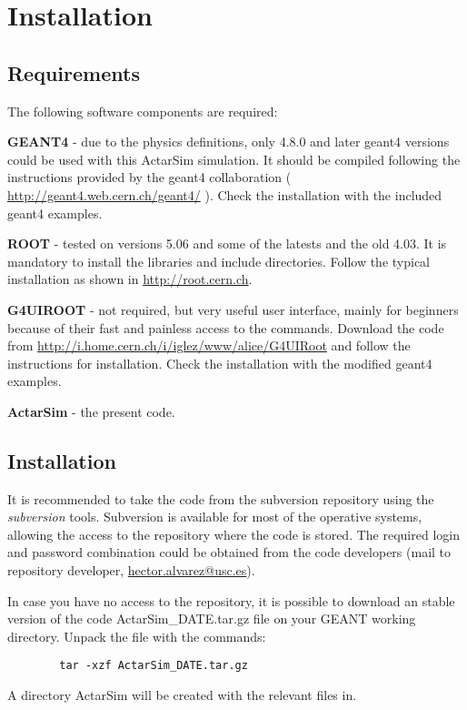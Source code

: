 \section{Installation}

\subsection{Requirements}

The following software components are required:

\textbf{GEANT4} - due to the physics definitions, only 4.8.0 and later geant4 versions could be used with this ActarSim simulation. It should be compiled following the instructions provided by the geant4 collaboration ( \url{http://geant4.web.cern.ch/geant4/} ). Check the installation with the included geant4 examples.

\textbf{ROOT} - tested on versions 5.06 and some of the latests and the old 4.03. It is mandatory to install the libraries and include directories. Follow the typical installation as shown in \url{http://root.cern.ch}.

\textbf{G4UIROOT} - not required, but very useful user interface, mainly for beginners because of their fast and painless access to the commands. Download the code from \url{http://i.home.cern.ch/i/iglez/www/alice/G4UIRoot} and follow the instructions for installation. Check the installation with the modified geant4 examples.

\textbf{ActarSim} - the present code.

\subsection{Installation}

It is recommended to take the code from the subversion repository using the \textit{subversion} tools. Subversion is available for most of the operative systems, allowing the access to the repository where the code is stored. The required login and password combination could be obtained from the code developers (mail to repository developer, \url{hector.alvarez@usc.es}).

In case you have no access to the repository, it is possible to download an stable version of the code ActarSim\_DATE.tar.gz file on your GEANT working directory. Unpack the file with the commands:
\begin{verbatim}
        tar -xzf ActarSim_DATE.tar.gz
\end{verbatim}
A directory ActarSim will be created with the relevant files in.

